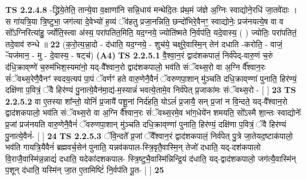 \documentclass[17pt]{extarticle}
\begin{document}
                  \newline
                                \textbf{ TS 2.2.4.8} \newline
                  -द्ध्रि॑ये॒तेति॒ तान्ये॒वा व॒क्षाणा॑नि सन्नि॒धाय॑ मन्थेदि॒तः प्र॑थ॒मं ज॑ज्ञे अ॒ग्निः स्वाद्योने॒रधि॑ जा॒तवे॑दाः । स गा॑यत्रि॒या त्रि॒ष्टुभा॒ जग॑त्या दे॒वेभ्यो॑ ह॒व्यं ॅव॑हतु प्रजा॒नन्निति॒ छन्दो॑भिरे॒वैनꣳ॒॒ स्वाद्योनेः॒ प्रज॑नयत्ये॒ष वा व सो᳚ऽग्निरित्या॑हु॒ र्ज्योति॒स्त्वा अ॑स्य॒ परा॑पतित॒मिति॒ यद॒ग्नये॒ ज्योति॑ष्मते नि॒र्वप॑ति॒ यदे॒वास्य॒ ( ) ज्योतिः॒ परा॑पतितं॒ तदे॒वाव॑ रुन्धे ॥ \textbf{  22} \newline
                  \newline
                      (क॒रो॒त्य॒न्ना॒दो - द॑धाति॒ यद॒ग्नये॒ - शुच॑ये॒ चक्षु॑रे॒वास्मि॒न् तेन॑ दधाति -करोति॒ - वाजं॒ -ॅयज॑मान॒ - मु - दे॒वास्य॒ - षट्च॑)  \textbf{(A4)} \newline \newline
                                        \textbf{ TS 2.2.5.1} \newline
                  वै॒श्वा॒न॒रं द्वाद॑शकपालं॒ निर्व॑पेद्-वारु॒णं च॒रुं द॑धि॒क्राव्‌ण्णे॑ च॒रुम॑भिश॒स्यमा॑नो॒ यद्-वै᳚श्वान॒रो द्वाद॑शकपालो॒ भव॑ति संॅवथ्स॒रो वा अ॒ग्नि र्वै᳚श्वान॒रः सं॑ॅवथ्स॒रेणै॒वैनꣳ॑ स्वदय॒त्यप॑ पा॒पं ॅवर्णꣳ॑ हते वारु॒णेनै॒वैनं॑ ॅवरुणपा॒शान् मु॑ञ्चति दधि॒क्राव्‌ण्णा॑ पुनाति॒ हिर॑ण्यं॒ दक्षि॑णा प॒वित्रं॒ ॅवै हिर॑ण्यं पु॒नात्ये॒वैन॑मा॒द्य॑-म॒स्यान्नं॑ भवत्ये॒तामे॒व निर्व॑पेत् प्र॒जाका॑मः संॅवथ्स॒रो - [  ] \textbf{  23} \newline
                  \newline
                                \textbf{ TS 2.2.5.2} \newline
                  वा ए॒तस्या शा᳚न्तो॒ योनिं॑ प्र॒जायै॑ पशू॒नां निर्द॑हति॒ योऽलं॑ प्र॒जायै॒ सन् प्र॒जां न वि॒न्दते॒ यद्-वै᳚श्वान॒रो द्वाद॑शकपालो॒ भव॑ति संॅवथ्स॒रो वा अ॒ग्नि र्वै᳚श्वान॒रः सं॑ॅवथ्स॒रमे॒व भा॑ग॒धेये॑न शमयति॒ सो᳚ऽस्मै शा॒न्तः स्वाद्योनेः᳚ प्र॒जां प्रज॑नयति वारु॒णेनै॒वैनं॑ ॅवरुणपा॒शान् मु॑ञ्चति दधि॒क्राव्‌ण्णा॑ पुनाति॒ हिर॑ण्यं॒ दक्षि॑णा प॒वित्रं॒ ॅवै हिर॑ण्यं पु॒नात्ये॒वैनं॑- [  ] \textbf{  24} \newline
                  \newline
                                \textbf{ TS 2.2.5.3} \newline
                  ॅवि॒न्दते᳚ प्र॒जां ॅवै᳚श्वान॒रं द्वाद॑शकपालं॒ निर्व॑पेत् पु॒त्रे जा॒तेयद॒ष्टाक॑पालो॒ भव॑ति गायत्रि॒यैवैनं॑ ब्रह्मवर्च॒सेन॑ पुनाति॒ यन्नव॑कपाल-स्त्रि॒वृतै॒वास्मि॒न् तेजो॑ दधाति॒ यद्-दश॑कपालो वि॒राजै॒वास्मि॑न्न॒न्नाद्यं॑ दधाति॒ यदेका॑दशकपाल- स्त्रि॒ष्टुभै॒वास्मि॑न्निन्द्रि॒यं द॑धाति॒ यद्-द्वाद॑शकपालो॒ जग॑त्यै॒वास्मि॑न् प॒शून् द॑धाति॒ यस्मि॑न् जा॒त ए॒तामिष्टिं॑ नि॒र्वप॑ति पू॒त- [  ] \textbf{  25} \newline
\end{document}

